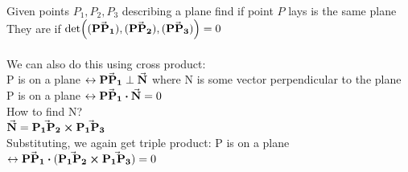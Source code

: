 \documentclass{article}
\begin{document}
    Given points $P_1 , P_2 , P_3$ describing a plane find if point $P$ lays is the same plane\\
    They are if $\det((\va{PP_1}), (\va{PP_2}), (\va{PP_3}))=0$\\\\
    We can also do this using cross product:\\
    P is on a plane $\leftrightarrow \va{PP_1} \perp \va{N}$ where N is some vector perpendicular to the plane\\
    P is on a plane $\leftrightarrow \va{PP_1} \vdot \va{N}=0$\\
    How to find N?\\
    $\va{N}=\va{P_1 P_2} \cross \va{P_1 P_3}$\\
    Substituting, we again get triple product:
    P is on a plane $\leftrightarrow \va{PP_1} \vdot (\va{P_1 P_2} \cross \va{P_1 P_3})=0$\\
\end{document}
